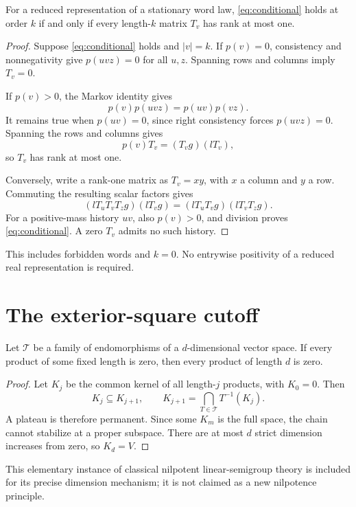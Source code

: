 \begin{proposition}\label{prop:rank}
For a reduced representation of a stationary word law, \eqref{eq:conditional} holds at order \(k\) if and only if every length-\(k\) matrix \(T_v\) has rank at most one.
\end{proposition}
\begin{proof}
Suppose \eqref{eq:conditional} holds and \(|v|=k\). If \(p(v)=0\), consistency and nonnegativity give \(p(uvz)=0\) for all \(u,z\). Spanning rows and columns imply \(T_v=0\).

If \(p(v)>0\), the Markov identity gives
\[
 p(v)p(uvz)=p(uv)p(vz).
\]
It remains true when \(p(uv)=0\), since right consistency forces \(p(uvz)=0\). Spanning the rows and columns gives
\[
 p(v)T_v=(T_vg)(lT_v),
\]
so \(T_v\) has rank at most one.

Conversely, write a rank-one matrix as \(T_v=xy\), with \(x\) a column and \(y\) a row. Commuting the resulting scalar factors gives
\[
 (lT_uT_vT_zg)(lT_vg)=(lT_uT_vg)(lT_vT_zg).
\]
For a positive-mass history \(uv\), also \(p(v)>0\), and division proves \eqref{eq:conditional}. A zero \(T_v\) admits no such history.
\end{proof}
This includes forbidden words and \(k=0\). No entrywise positivity of a reduced real representation is required.

\section{The exterior-square cutoff}
\begin{lemma}\label{lem:nilpotence}
Let \(\mathcal T\) be a family of endomorphisms of a \(d\)-dimensional vector space. If every product of some fixed length is zero, then every product of length \(d\) is zero.
\end{lemma}
\begin{proof}
Let \(K_j\) be the common kernel of all length-\(j\) products, with \(K_0=0\). Then
\[
 K_j\subseteq K_{j+1},\qquad
 K_{j+1}=\bigcap_{T\in\mathcal T}T^{-1}(K_j).
\]
A plateau is therefore permanent. Since some \(K_m\) is the full space, the chain cannot stabilize at a proper subspace. There are at most \(d\) strict dimension increases from zero, so \(K_d=V\).
\end{proof}
This elementary instance of classical nilpotent linear-semigroup theory is included for its precise dimension mechanism; it is not claimed as a new nilpotence principle.

